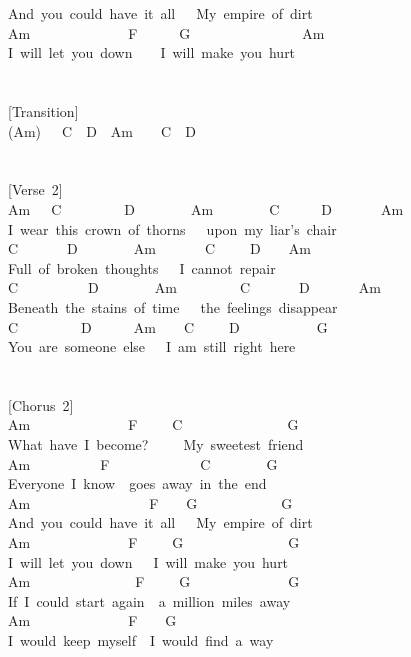 \documentclass[]{book}
\begin{document}
And~you~could~have~it~all~~~My~empire~of~dirt\\
Am~~~~~~~~~~~~~~F~~~~~~G~~~~~~~~~~~~~~~~Am\\
I~will~let~you~down~~~~I~will~make~you~hurt\\
~\\
~\\
{[}Transition{]}\\
(Am)~~~C~~D~~Am~~~~C~~D\\
~\\
~\\
{[}Verse~2{]}\\
Am~~~C~~~~~~~~~D~~~~~~~~Am~~~~~~~~C~~~~~~D~~~~~~~Am\\
\hspace*{0.333em}\hspace*{0.333em}\hspace*{0.333em}I~wear~this~crown~of~thorns~~~upon~my~liar's~chair\\
C~~~~~~~D~~~~~~~~Am~~~~~~~C~~~~~D~~~~Am\\
Full~of~broken~thoughts~~~I~cannot~repair\\
\hspace*{0.333em}\hspace*{0.333em}C~~~~~~~~~~D~~~~~~~~Am~~~~~~~~~C~~~~~~~D~~~~~~~Am\\
Beneath~the~stains~of~time~~~the~feelings~disappear\\
C~~~~~~~~~D~~~~~~Am~~~~C~~~~~D~~~~~~~~~~~G\\
You~are~someone~else~~~I~am~still~right~here\\
~\\
~\\
{[}Chorus~2{]}\\
Am~~~~~~~~~~~~~~F~~~~~C~~~~~~~~~~~~~~~G\\
What~have~I~become?~~~~~My~sweetest~friend\\
Am~~~~~~~~~~F~~~~~~~~~~~~~C~~~~~~~~G\\
Everyone~I~know~~goes~away~in~the~end\\
\hspace*{0.333em}\hspace*{0.333em}\hspace*{0.333em}\hspace*{0.333em}Am~~~~~~~~~~~~~~~~~F~~~~G~~~~~~~~~~~~G\\
And~you~could~have~it~all~~~My~empire~of~dirt\\
Am~~~~~~~~~~~~~~F~~~~~G~~~~~~~~~~~~~~~G\\
I~will~let~you~down~~~I~will~make~you~hurt\\
\hspace*{0.333em}\hspace*{0.333em}\hspace*{0.333em}Am~~~~~~~~~~~~~~~F~~~~~G~~~~~~~~~~~~~~G\\
If~I~could~start~again~~a~million~miles~away\\
Am~~~~~~~~~~~~~~F~~~~G\\
I~would~keep~myself~~I~would~find~a~way\\
\end{document}

